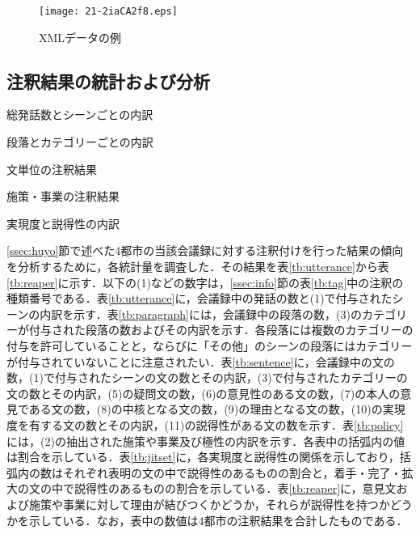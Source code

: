 \documentclass[japanese]{jnlp_1.4}
\begin{document}
\begin{figure}[p]
 \begin{center}
 \texttt{[image: 21-2iaCA2f8.eps]}
 \end{center}
 \caption{XMLデータの例}
 \label{fg:xml}
\end{figure}


\subsection{注釈結果の統計および分析}

\begin{table}[p]
\caption{総発話数とシーンごとの内訳}
\label{tb:utterance}

\end{table}
\begin{table}[p]
 \caption{段落とカテゴリーごとの内訳}
 \label{tb:paragraph}

\end{table}
\begin{table}[p]
 \caption{文単位の注釈結果}
 \label{tb:sentence}

\end{table}
\begin{table}[p]
 \caption{施策・事業の注釈結果}
 \label{tb:policy}

\end{table}
\begin{table}[p]
 \caption{実現度と説得性の内訳}
 \label{tb:jitset}

\end{table}


\ref{ssec:huyo}節で述べた4都市の当該会議録に対する注釈付けを行った結果の傾向を分析するために，各統計量を調査した．その結果を表\ref{tb:utterance}から表\ref{tb:reaper}に示す．以下の(1)などの数字は，\ref{ssec:info}節の\mbox{表\ref{tb:tag}}中の注釈の種類番号である．表\ref{tb:utterance}に，会議録中の発話の数と(1)で付与されたシーンの内訳を示す．表\ref{tb:paragraph}には，会議録中の段落の数，(3)のカテゴリーが付与された段落の数およびその内訳を示す．各段落には複数のカテゴリーの付与を許可していることと，ならびに「その他」のシーンの段落にはカテゴリーが付与されていないことに注意されたい．表\ref{tb:sentence}に，会議録中の文の数，(1)で付与されたシーンの文の数とその内訳，(3)で付与されたカテゴリーの文の数とその内訳，(5)の疑問文の数，(6)の意見性のある文の数，(7)の本人の意見である文の数，(8)の中核となる文の数，(9)の理由となる文の数，(10)の実現度を有する文の数とその内訳，(11)の説得性がある文の数を示す．表\ref{tb:policy}には，(2)の抽出された施策や事業及び極性の内訳を示す．各表中の括弧内の値は割合を示している．表\ref{tb:jitset}に，各実現度と説得性の関係を示しており，括弧内の数はそれぞれ表明の文の中で説得性のあるものの割合と，着手・完了・拡大の文の中で説得性のあるものの割合を示している．表\ref{tb:reaper}に，意見文および施策や事業に対して理由が結びつくかどうか，それらが説得性を持つかどうかを示している．なお，表中の数値は4都市の注釈結果を合計したものである．
\end{document}
